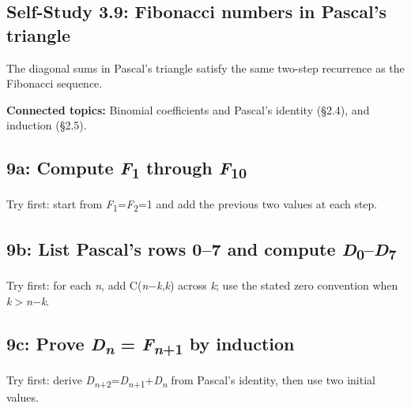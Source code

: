 \documentclass[11pt]{article}
\begin{document}
\begin{keepsection}
\section{Self-Study 3.9: Fibonacci numbers in Pascal’s triangle}

The diagonal sums in Pascal’s triangle satisfy the same two-step recurrence as the Fibonacci sequence.

\textbf{Connected topics:} Binomial coefficients and Pascal’s identity (§2.4), and induction (§2.5).

\begin{keepsection}
\subsection{9a: Compute \textit{F}\textsubscript{1} through \textit{F}\textsubscript{10}}

Try first: start from \textit{F}\textsubscript{1}=\textit{F}\textsubscript{2}=1 and add the previous two values at each step.

\end{keepsection}

\begin{keepsection}
\subsection{9b: List Pascal’s rows 0–7 and compute \textit{D}\textsubscript{0}–\textit{D}\textsubscript{7}}

Try first: for each \textit{n}, add C(\textit{n}\ensuremath{-}\textit{k},\textit{k}) across \textit{k}; use the stated zero convention when \textit{k}\ensuremath{>}\textit{n}\ensuremath{-}\textit{k}.

\end{keepsection}

\begin{keepsection}
\subsection{9c: Prove \textit{D}\textsubscript{\textit{n}} = \textit{F}\textsubscript{\textit{n}+1} by induction}

Try first: derive \textit{D}\textsubscript{\textit{n}+2}=\textit{D}\textsubscript{\textit{n}+1}+\textit{D}\textsubscript{\textit{n}} from Pascal’s identity, then use two initial values.

\end{keepsection}
\end{keepsection}
\end{document}

